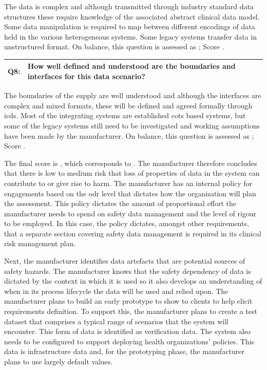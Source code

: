 The data is complex and although transmitted through industry standard data structures these require knowledge of the associated abstract clinical data model. Some data manipulation is required to map between different encodings of data held in the various heterogeneous systems. Some legacy systems transfer data in unstructured format. On balance, this question is assessed as ; Score .

\addtocounter{table}{-1} %
\begin{longtable*}[H]
	{|L{}|L{}|}
	\hline
	Q8: & How well defined and understood are the boundaries and interfaces for this data scenario?\\
	\hline
\end{longtable*}
The boundaries of the supply are well understood and although the interfaces are complex and mixed formats, these will be defined and agreed formally through \glspl{icd}. Most of the integrating systems are established \gls{cots} based systems, but some of the legacy systems still need to be investigated and working assumptions have been
made by the manufacturer. On balance, this question is assessed as ; Score .

The final score is , which corresponds to . The manufacturer therefore concludes that there is low to medium risk that loss of properties of data in the system can contribute to or give rise to harm. The manufacturer has an internal policy for engagements based on the \gls{odr} level that dictates how the organization will plan the assessment. This policy dictates the amount of proportional effort the manufacturer needs to spend on safety data management and the level of rigour to be employed. In this case, the policy dictates, amongst other requirements, that a separate section covering safety data management is required in its clinical risk management plan.

Next, the manufacturer identifies \glspl{data artefact} that are potential sources of safety hazards. The manufacturer knows that the safety dependency of data is dictated by the context in which it is used so it also develops an understanding of when in its process lifecycle the data will be used and relied upon. The manufacturer plans to build an early prototype to show to clients to help elicit requirements definition. To support this, the manufacturer plans to create a test \gls{dataset} that comprises a typical range of scenarios that the system will encounter. This form of data is identified as \gls{verification} data. The system also needs to be configured to support deploying health organizations' policies. This data is infrastructure data and, for the prototyping phase, the manufacturer plans to use largely default values.


